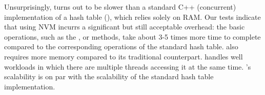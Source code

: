     Unsurprisingly, \PHT turns out to be slower than a standard C++ (concurrent)  implementation of a hash table (\StandardHashMap), which relies solely on RAM. Our tests indicate that using NVM incurrs a significant but still acceptable overhead: the basic operations, such as the \getMethod, \insertMethod or \removeMethod methods, take about 3-5 times more time to complete compared to the corresponding operations of the standard hash table. \PHT also requires  more memory compared to its traditional counterpart. \PHT handles well workloads in which there are multiple threads accessing it at the same time. \PHT's scalability is on par with the scalability of the standard hash table implementation.
    

